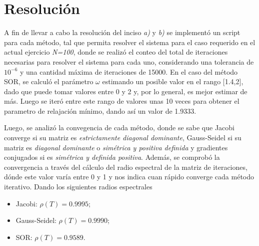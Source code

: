 \documentclass[11pt]{article}
\begin{document}
\section*{Resolución}
A fin de llevar a cabo la resolución del inciso \textit{a)} y \textit{b)} se implementó un script para
cada método, tal que permita resolver el sistema para el caso requerido
en el actual ejercicio \textit{N=100}, donde se realizó el conteo del total
de iteraciones necesarias para resolver el sistema para cada uno,
considerando una tolerancia de $10^{-6}$ y una cantidad máxima de iteraciones
de 15000. En el caso del método SOR, se calculó el parámetro $\omega$ estimando un
posible valor en el rango [1.4,2], dado que puede tomar valores entre 0 y 2 y, por lo general,
es mejor estimar de más. Luego se iteró entre este rango de valores unas 10 veces para obtener el
parametro de relajación mínimo, dando así un valor de 1.9333.

Luego, se analizó la convegencia de cada método, donde se sabe que Jacobi converge si su matriz es
\textit{estrictamente diagonal dominante}, Gauss-Seidel si su matriz es \textit{diagonal dominante} o
\textit{simétrica y positiva definida} y gradientes conjugados si es \textit{simétrica y definida positiva}.
Además, se comprobó la convergencia a través del cálculo del radio espectral de
la matriz de iteraciones, dónde este valor varía entre 0 y 1 y nos indica cuan rápido converge cada método iterativo.
Dando los siguientes radios espectrales

\begin{itemize}
	\item Jacobi: $\rho(T)=0.9995$;
	\item Gauss-Seidel: $\rho(T)=0.9990$;
	\item SOR: $\rho(T)=0.9589$.
\end{itemize}
\end{document}
